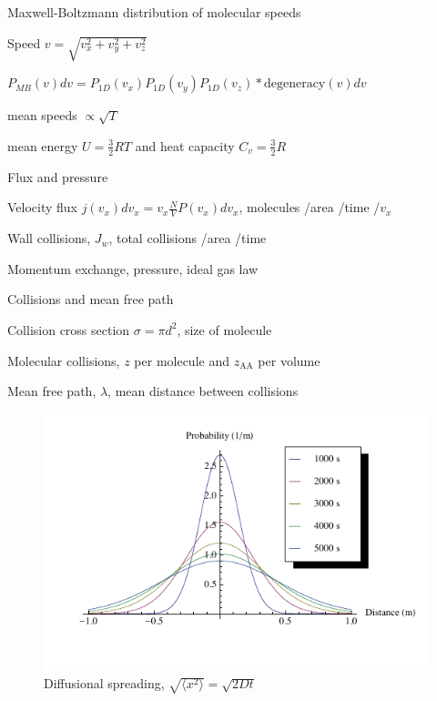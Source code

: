 \documentclass[11pt]{article}
\begin{document}
\begin{outline}
\begin{outline}
 \item{Maxwell-Boltzmann distribution of molecular speeds}
    \begin{outline}
     \item{Speed $v=\sqrt{v_x^2+v_y^2+v_z^2}$}
     \item{$P_{MB}(v) dv = P_{1D}(v_x) P_{1D}(v_y) P_{1D}(v_z) * \text{degeneracy}(v) dv$}
      \item{mean speeds $\propto \sqrt{T}$ }
      \item{mean energy $U=\frac{3}{2} RT$ and heat capacity $C_v=\frac{3}{2} R$}
    \end{outline}
  \item{Flux and pressure}
    \begin{outline}
    \item{Velocity flux $j(v_x) dv_x= v_x \frac{N}{V}P(v_x)dv_x$, molecules /area /time /$v_x$}
    \item{Wall collisions, $J_w$, total collisions /area /time}
    \item{Momentum exchange, pressure, ideal gas law}
    \end{outline}
  \item{Collisions and mean free path}
    \begin{outline}
   \item{Collision cross section $\sigma=\pi d^2$, size of molecule}
    \item {Molecular collisions, $z$ per molecule and $z_{\mathrm{AA}}$ per volume}
    \item{Mean free path, $\lambda$, mean distance between collisions}
    \end{outline}
  \end{outline}
 
\begin{figure}
\begin{center}
\includegraphics[scale=1.25]{Images/Diffusion.pdf}
\caption{Diffusional spreading, $\sqrt{\langle x^2 \rangle} = \sqrt{2 D t}$}
\end{center}
\end{figure}


\end{outline}
\end{document}
